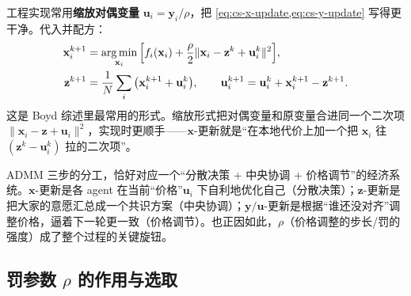 工程实现常用\textbf{缩放对偶变量} $\mathbf{u}_i=\mathbf{y}_i/\rho$，把 \cref{eq:cs-x-update,eq:cs-y-update} 写得更干净。代入并配方：
\begin{align}
  \mathbf{x}_i^{k+1}&=\operatorname*{arg\,min}_{\mathbf{x}_i}\Big[f_i(\mathbf{x}_i)+\frac{\rho}{2}\|\mathbf{x}_i-\mathbf{z}^k+\mathbf{u}_i^k\|^2\Big],
  \label{eq:cs-x-scaled}\\
  \mathbf{z}^{k+1}&=\frac1N\sum_i\big(\mathbf{x}_i^{k+1}+\mathbf{u}_i^k\big),\qquad \mathbf{u}_i^{k+1}=\mathbf{u}_i^k+\mathbf{x}_i^{k+1}-\mathbf{z}^{k+1}.
  \label{eq:cs-zu-scaled}
\end{align}
这是 Boyd 综述里最常用的形式。缩放形式把对偶变量和原变量合进同一个二次项 $\|\mathbf{x}_i-\mathbf{z}+\mathbf{u}_i\|^2$，实现时更顺手——$\mathbf{x}$-更新就是“在本地代价上加一个把 $\mathbf{x}_i$ 往 $(\mathbf{z}^k-\mathbf{u}_i^k)$ 拉的二次项”。

\begin{insight}[ADMM 三步 $=$ 分散决策 + 中央协调 + 价格调节]\label{ins:cs-admm-econ}
ADMM 三步的分工，恰好对应一个“分散决策 + 中央协调 + 价格调节”的经济系统。$\mathbf{x}$-更新是各 agent 在当前“价格”$\mathbf{u}_i$ 下自利地优化自己（分散决策）；$\mathbf{z}$-更新是把大家的意愿汇总成一个共识方案（中央协调）；$\mathbf{y}/\mathbf{u}$-更新是根据“谁还没对齐”调整价格，逼着下一轮更一致（价格调节）。也正因如此，$\rho$（价格调整的步长/罚的强度）成了整个过程的关键旋钮。
\end{insight}

\subsection{罚参数 \texorpdfstring{$\rho$}{rho} 的作用与选取}
\label{sec:cs-rho}

